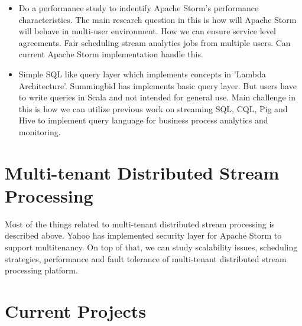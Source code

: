 \documentclass{article}
\begin{document}
\begin{itemize}
  \item Do a performance study to indentify Apache Storm's performance
    characteristics. The main research question in this is how will
    Apache Storm will behave in multi-user environment. How we can
    ensure service level agreements. Fair scheduling stream analytics
    jobs from multiple users. Can current Apache Storm implementation
    handle this.
  \item Simple SQL like query layer which implements concepts in
    'Lambda Architecture'. Summingbid has implements basic query
    layer. But users have to write queries in Scala and not intended
    for general use. Main challenge in this is how we can utilize
    previous work on streaming SQL, CQL, Pig and Hive to implement
    query language for business process analytics and monitoring.
\end{itemize}



\section{Multi-tenant Distributed Stream Processing}

Most of the things related to multi-tenant distributed stream
processing is described above. Yahoo has implemented security layer for
Apache Storm to support multitenancy. On top of that, we can
study scalability issues, scheduling strategies, performance and fault
tolerance of multi-tenant distributed stream processing platform.

\section{Current Projects}

\begin{itemize}
\end{itemize}
\end{document}
